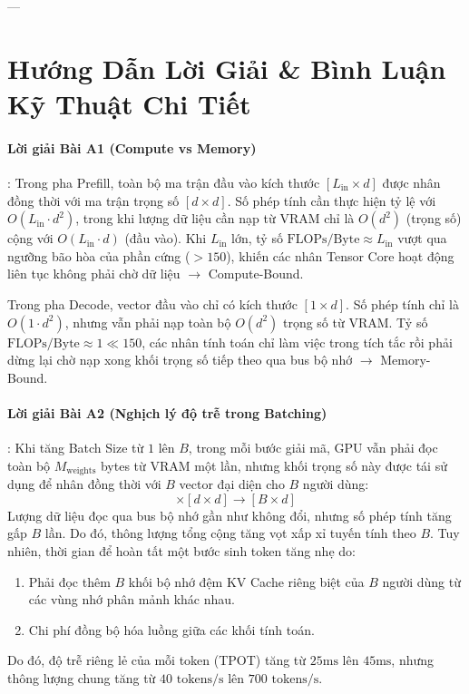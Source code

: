 ---

\section{Hướng Dẫn Lời Giải \& Bình Luận Kỹ Thuật Chi Tiết}
\label{sec:chapter1-solutions}

\paragraph{Lời giải Bài A1 (Compute vs Memory)}:
Trong pha Prefill, toàn bộ ma trận đầu vào kích thước $[L_{\text{in}} \times d]$ được nhân đồng thời với ma trận trọng số $[d \times d]$. Số phép tính cần thực hiện tỷ lệ với $O(L_{\text{in}} \cdot d^2)$, trong khi lượng dữ liệu cần nạp từ VRAM chỉ là $O(d^2)$ (trọng số) cộng với $O(L_{\text{in}} \cdot d)$ (đầu vào). Khi $L_{\text{in}}$ lớn, tỷ số $\text{FLOPs/Byte} \approx L_{\text{in}}$ vượt qua ngưỡng bão hòa của phần cứng ($> 150$), khiến các nhân Tensor Core hoạt động liên tục không phải chờ dữ liệu $\rightarrow$ Compute-Bound. 

Trong pha Decode, vector đầu vào chỉ có kích thước $[1 \times d]$. Số phép tính chỉ là $O(1 \cdot d^2)$, nhưng vẫn phải nạp toàn bộ $O(d^2)$ trọng số từ VRAM. Tỷ số $\text{FLOPs/Byte} \approx 1 \ll 150$, các nhân tính toán chỉ làm việc trong tích tắc rồi phải dừng lại chờ nạp xong khối trọng số tiếp theo qua bus bộ nhớ $\rightarrow$ Memory-Bound.

\paragraph{Lời giải Bài A2 (Nghịch lý độ trễ trong Batching)}:
Khi tăng Batch Size từ $1$ lên $B$, trong mỗi bước giải mã, GPU vẫn phải đọc toàn bộ $M_{\text{weights}}$ bytes từ VRAM một lần, nhưng khối trọng số này được tái sử dụng để nhân đồng thời với $B$ vector đại diện cho $B$ người dùng:
\begin{equation*}
[B \times d] \times [d \times d] \longrightarrow [B \times d]
\end{equation*}
Lượng dữ liệu đọc qua bus bộ nhớ gần như không đổi, nhưng số phép tính tăng gấp $B$ lần. Do đó, thông lượng tổng cộng tăng vọt xấp xỉ tuyến tính theo $B$. Tuy nhiên, thời gian để hoàn tất một bước sinh token tăng nhẹ do:
\begin{enumerate}
  \item Phải đọc thêm $B$ khối bộ nhớ đệm KV Cache riêng biệt của $B$ người dùng từ các vùng nhớ phân mảnh khác nhau.
  \item Chi phí đồng bộ hóa luồng giữa các khối tính toán.
\end{enumerate}
Do đó, độ trễ riêng lẻ của mỗi token (TPOT) tăng từ $25\text{ms}$ lên $45\text{ms}$, nhưng thông lượng chung tăng từ $40\text{ tokens/s}$ lên $700\text{ tokens/s}$.


